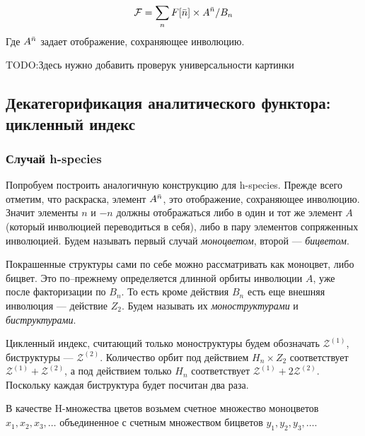 
\begin{equation}
\label{eq:h-an}
	\mathcal F = \sum\limits_n F[\Bar n] \times A^{\Bar n} / B_n
\end{equation}
Где $A^{\Bar n}$ задает отображение, сохраняющее инволюцию. 

TODO:Здесь нужно добавить проверук универсальности картинки

\subsection{Декатегорификация аналитического функтора: цикленный индекс} 

\subsubsection{Случай h-species}
Попробуем построить аналогичную конструкцию для h-species.
Прежде всего отметим, что раскраска, элемент $A^{\Bar n}$, это отображение,
сохраняющее инволюцию. Значит элементы $n$ и $-n$ должны отображаться либо в
один и тот же элемент $A$ (который инволюцией переводиться в себя), либо в пару
элементов сопряженных инволюцией. Будем называть первый случай
\emph{моноцветом}, второй --- \emph{бицветом}.	

Покрашенные структуры сами по себе можно рассматривать как моноцвет, либо
бицвет. Это по--прежнему определяется длинной орбиты инволюции $A$, уже
после факторизации по $B_n$. То есть кроме действия $B_n$ есть еще внешняя
инволюция --- действие $Z_2$. Будем называть их \emph{моноструктурами} и
\emph{биструктурами}.

Цикленный индекс, считающий только моноструктуры будем обозначать
$\mathcal Z^{(1)}$, биструктуры --- $\mathcal Z^{(2)}$. Количество орбит под
действием $H_n \times Z_2$ соответствует $\mathcal Z^{(1)} + \mathcal Z^{(2)}$,
а под действием только $H_n$ соответствует $\mathcal Z^{(1)} + 2\mathcal
Z^{(2)}$. Поскольку каждая биструктура будет посчитан два раза.

В качестве H-множества цветов возьмем счетное множество моноцветов $x_1, x_2,
x_3, \dots$ объединенное с счетным множеством бицветов $y_1, y_2, y_3, \dots$.

